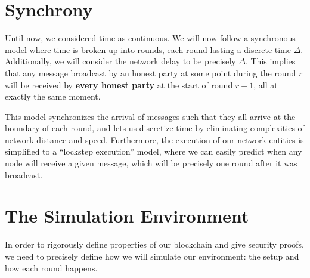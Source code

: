 \section{Synchrony}
Until now, we considered time as continuous. We will now follow a synchronous model where time is broken
up into rounds, each round lasting a discrete time $\Delta$. Additionally, we will consider the network
delay to be precisely $\Delta$. This implies that any message broadcast by an honest party at some point
during the round $r$ will be received by \textbf{every honest party} at the start of round $r+1$, all at
exactly the same moment.

This model synchronizes the arrival of messages such that they all arrive at the boundary of each round,
and lets us discretize time by eliminating complexities of network distance and speed. Furthermore, the execution
of our network entities is simplified to a ``lockstep execution'' model, where we can easily predict when
any node will receive a given message, which will be precisely one round after it was broadcast.

\section{The Simulation Environment}
In order to rigorously define properties of our blockchain and give security proofs, we need to precisely define how we will simulate our environment: the setup and how each round happens.

